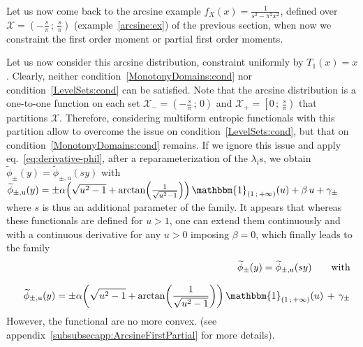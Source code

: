 \documentclass[entropy,article,submit,moreauthors,pdftex]{Definitions/mdpi}
\newcounter{arcsineExample}%
\newcommand{\SZ}[1]{{\color{blue} #1}}                                       %
\def\X{\mathcal{X}}%
\def\un{\mathbbm{1}}%
\def\u{\mathrm{u}}
\begin{document}
\

Let us now come  back to the arcsine example \SZ{$f_X(x)  = \frac{1}{s^2 - \pi^2
    x^2}$,  defined over  $\X =  \left( -  \frac{s}{\pi} \,  ; \,  \frac{s}{\pi}
  \right)$}  (example~\ref{arcsine:ex}) of  the  previous section,  when now  we
constraint the first order moment or partial first order moments.

\setcounter{example}{0}
\renewcommand{\theexample}{\thearcsineExample-\arabic{example}}

\SZ{
\begin{Example}\label{arcsineUni:ex}
  Let us now consider this arcsine distribution, constraint uniformly by $T_1(x)
  =    x$.     Clearly,   neither    condition~\ref{MonotonyDomains:cond}    nor
  condition~\ref{LevelSets:cond}  can  be  satisfied.   Note  that  the  arcsine
  distribution  is  a  one-to-one  function  on   each  set  $\X_-  =  \left(  -
  \frac{s}{\pi} \, ;  \, 0 \right)$ and  $\X_+ = \left[ 0 \,  ; \, \frac{s}{\pi}
    \right)$ that  partitions $\X$.   Therefore, considering  multiform entropic
    functionals   with  this   partition  allow   to  overcome   the  issue   on
    condition~\ref{LevelSets:cond},            but            that            on
    condition~\ref{MonotonyDomains:cond} remains.   If we ignore this  issue and
    apply  eq.~\eqref{eq:derivative-phil},  after  a reparameterization  of  the
    $\lambda_i$s,        we       obtain        $\widetilde{\phi}_\pm(y)       =
    \widetilde{\phi}_{\pm,\u}(s  y)$  with $\widetilde{\phi}_{\pm,\u}(y)  =  \pm
    \alpha  \left(  \sqrt{u^2 -  1}  +  \arctan\left( \frac{1}{\sqrt{u^2  -  1}}
    \right) \right) \, \un_{( 1 \, ; \, +\infty )}(u) + \beta \, u + \gamma_\pm$
    where $s$  is thus an additional  parameter of the family.   It appears that
    whereas  these functionals  are defined  for $u  > 1$,  one can  extend them
    continuously  and with  a continuous  derivative for  any $u  > 0$  imposing
    $\beta = 0$, which finally leads to the family
  \begin{eqnarray*}
  &&\widetilde{\phi}_\pm(y) =  \widetilde{\phi}_{\pm,\u}(s y) \qquad \mbox{with}
  \\[2.5mm]
   && \widetilde{\phi}_{\pm,\u}(y) = \pm \alpha  \left( \sqrt{u^2 -
   1} + \arctan\left( \frac{1}{\sqrt{u^2 - 1}} \right)  \right)
  \, \un_{(  1 \, ;  \, +\infty )}(u) \, + \, \gamma_{\pm}
  \end{eqnarray*}
  However,     the     functional     are      no     more     convex.      (see
  appendix~\ref{subsubsecapp:ArcsineFirstPartial} for more details).
\end{Example}


}
\end{document}
